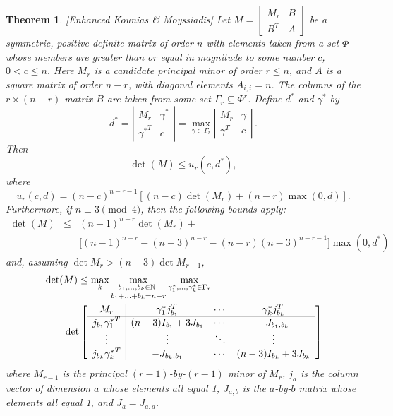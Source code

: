 \documentclass[11pt,a4paper]{article}
\newtheorem{theorem}{Theorem}
\begin{document}
\begin{theorem} \label{thm:enhancedKM} \emph{[Enhanced Kounias \& Moyssiadis]}
Let $M = \left [\begin{matrix}M_r &B\\ B^T & A \end{matrix} \right ]$ 
be a symmetric, positive definite matrix of
order $n$ with elements taken from a set $\Phi$ whose members are greater
than or equal in magnitude to some number $c$, 
$0 < c \le n$.  
Here $M_r$ is a
candidate principal minor of order $r \le n$, and $A$ is a square matrix of
order $n-r$, with diagonal elements $A_{i,i}=n$.  
The columns of the $r \times (n-r)$
matrix $B$ are taken from some set $\Gamma_r \subseteq \Phi^r$.  Define
$d^*$ and $\gamma^*$ by
\begin{equation} \label{eq:dstar}
d^* = \left | \begin{matrix}M_r & \gamma^*\\ 
      {\gamma^*}^T & c\end{matrix}\right |
=
\max_{\gamma \in \Gamma_r}
\left | \begin{matrix}M_r & \gamma \\ {\gamma}^T & c\end{matrix}\right |\,.
\end{equation}
Then
\begin{equation} \label{eqn:bound}
\det(M) \le u_r(c,d^*),
\end{equation}
where
\begin{equation*}
u_r(c,d) =  (n - c)^{n-r-1}\left [(n - c)\det(M_r) + 
		(n - r )\max(0, d)\right ].
\end{equation*}
Furthermore, if $n \equiv 3 \pmod 4$, 
then the following bounds apply:
\begin{eqnarray} \label{eqn:sharperbound} %
\det(M) & \le & (n-1)^{n-r}\det(M_r) +   \\ \nonumber
	    && {[}(n-1)^{n-r} - (n-3)^{n-r} - (n-r)(n-3)^{n-r-1}]\max(0,d^*)
\end{eqnarray}
and, assuming $\det M_r > (n-3)\det M_{r-1}$,  
\begin{align} \label{eqn:evensharperbound} %
\renewcommand{\arraystretch}{1.2}
&\det(M) \le \max_k\mathop{\max_{b_1,\ldots,b_k\in\mathbb{N}_1}}_{b_1+
  \ldots+b_k=n-r}
\max_{\gamma_1^*,\ldots,\gamma_k^* \in \Gamma_r}\notag\\
&\qquad\det
\left[\begin{array}{c|ccc}M_r & \gamma_1^*j_{b_1}^T & 
  \cdots & \gamma_k^*j_{b_k}^T\\
\hline
j_{b_1}{\gamma_1^*}^T & (n-3)I_{b_1}+3J_{b_1} &\cdots & -J_{b_1,b_k}\\
\vdots & \vdots  & \ddots & \vdots\\
j_{b_k}{\gamma_k^*}^T & -J_{b_k,b_1} & \cdots & (n-3)I_{b_k}+3J_{b_k}
\end{array}\right]
\renewcommand{\arraystretch}{1}
\end{align}
where $M_{r-1}$ is the principal $(r-1)$-by-$(r-1)$ minor of $M_r$, $j_a$ is
the column vector of dimension $a$ whose elements all equal 1, $J_{a,b}$ is
the $a$-by-$b$ matrix whose elements all equal 1, and $J_a=J_{a,a}$.
\end{theorem}
\end{document}
